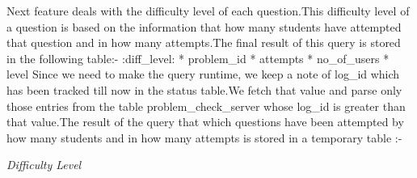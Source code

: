 \documentclass[a4paper,12pt,oneside]{sphinxmanual}
\begin{document}
Next feature deals with the difficulty level of each question.This difficulty level of a question is based on the information that how many students have attempted that question and in how many attempts.The final result of this query is stored in the following table:-
:diff\_level:
* problem\_id
* attempts
* no\_of\_users
* level
\textbar{} Since we need to make the query runtime, we keep a note of log\_id which has been tracked till now in the status table.We fetch that value and parse only those entries from the table problem\_check\_server whose log\_id is greater than that value.The result of the query that which questions have been attempted by how many students and in how many attempts is stored in a temporary table :-

\emph{Difficulty Level}
\begin{figure}[htbp]
\centering

\end{figure}
\end{document}
